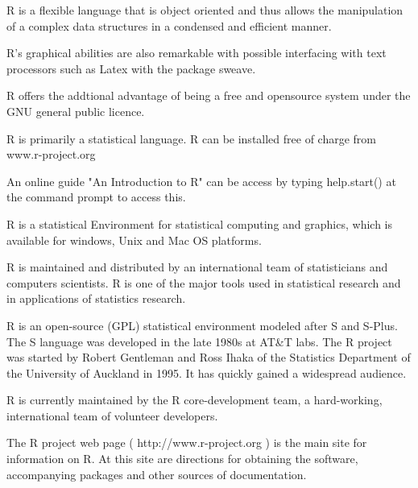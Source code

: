 \begin{frame}
R is a flexible language that is object oriented and thus allows the manipulation of a complex data structures in a condensed and efficient manner.


R's graphical abilities are also remarkable with possible interfacing with text processors such as Latex with the package sweave.

R offers the addtional advantage of being a free and opensource system under the GNU general public licence.

R is primarily a statistical language. R can be installed free of charge from www.r-project.org
\end{frame}
\begin{frame}
An online guide "An Introduction to R" can be access by typing help.start() at the command prompt to access this.

R is a statistical Environment for statistical computing and graphics, which is available for windows, Unix and Mac OS platforms.

R is maintained and distributed by an international team of statisticians and computers scientists.
R is one of the major tools used in statistical research and in applications of statistics research.

R is an open-source (GPL) statistical environment modeled after S and S-Plus. The S language was developed in the late 1980s at AT&T labs. The R project was started by Robert Gentleman and Ross Ihaka of the Statistics Department of the University of Auckland in 1995. It has quickly gained a widespread audience. 
\end{frame}
\begin{frame}
R is currently maintained by the R core-development team, a hard-working, international team of volunteer developers. 

The R project web page ( http://www.r-project.org ) is the main site for information on R. At this site are directions for obtaining the software, accompanying packages and other sources of documentation.

\end{frame}

